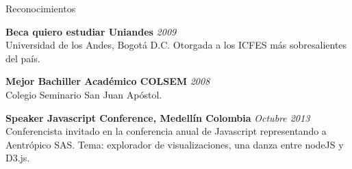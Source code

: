 \documentclass[spanish]{resume} %
\begin{document}
\begin{rSection}{Reconocimientos}

{\bf Beca quiero estudiar Uniandes} \hfill {\em 2009} \\
Universidad de los Andes, Bogot\'a D.C.
Otorgada a los ICFES m\'as sobresalientes del pa\'is.

{\bf Mejor Bachiller Acad\'emico COLSEM} \hfill {\em 2008} \\
Colegio Seminario San Juan Ap\'ostol.

{\bf Speaker Javascript Conference, Medell\'in Colombia} \hfill {\em Octubre 2013} \\
Conferencista invitado en la conferencia anual de Javascript representando a Aentr\'opico SAS.
Tema: explorador de visualizaciones, una danza entre nodeJS y D3.js.


\end{rSection}
\end{document}
